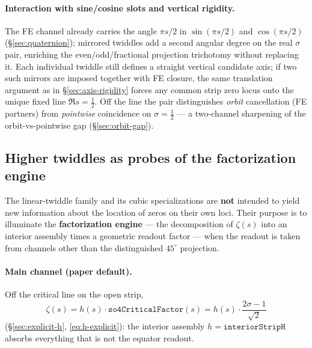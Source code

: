 \documentclass[11pt]{amsart}
\begin{document}
\paragraph{Interaction with sine/cosine slots and vertical rigidity.}
The FE channel already carries the angle $\pi s/2$ in
$\sin(\pi s/2)$ and $\cos(\pi s/2)$ (\S\ref{sec:quaternion}); mirrored twiddles
add a second angular degree on the real $\sigma$ pair, enriching the
even/odd/fractional projection trichotomy without replacing it.
Each individual twiddle still defines a straight vertical candidate axis; if
two such mirrors are imposed together with FE closure, the same translation
argument as in \S\ref{sec:axis-rigidity} forces any common strip zero locus onto
the unique fixed line $\Re s=\tfrac12$.
Off the line the pair distinguishes \emph{orbit} cancellation (FE partners) from
\emph{pointwise} coincidence on $\sigma=\tfrac12$ --- a two-channel sharpening
of the orbit-vs-pointwise gap (\S\ref{sec:orbit-gap}).

\subsection{Higher twiddles as probes of the factorization engine}\label{sec:higher-twiddle-probes}

The linear-twiddle family and its cubic specializations are \textbf{not} intended
to yield new information about the location of zeros on their own loci.  Their
purpose is to illuminate the \textbf{factorization engine} --- the decomposition
of $\zeta(s)$ into an interior assembly times a geometric readout factor --- when
the readout is taken from channels other than the distinguished $45^\circ$
projection.

\paragraph{Main channel (paper default).}
Off the critical line on the open strip,
\[
  \zeta(s)=h(s)\cdot\texttt{so4CriticalFactor}(s)
  =h(s)\cdot\frac{2\sigma-1}{\sqrt2}
\]
(\S\ref{sec:explicit-h}, \eqref{eq:h-explicit}): the interior assembly
$h=\texttt{interiorStripH}$ absorbs everything that is not the equator readout.
\end{document}
